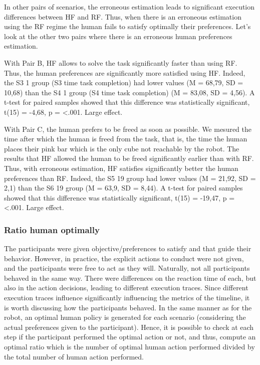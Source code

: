 In other pairs of scenarios, the erroneous estimation leads to significant execution differences between HF and RF. Thus, when there is an erroneous estimation using the RF regime the human fails to satisfy optimally their preferences. Let's look at the other two pairs where there is an erroneous human preferences estimation. 

With Pair B, HF allows to solve the task significantly faster than using RF. Thus, the human preferences are significantly more satisfied using HF.   
Indeed, the S3 1 group (S3 time task completion) had lower values (M = 68,79, SD = 10,68) than the S4 1 group (S4 time task completion) (M = 83,08, SD = 4,56). A t-test for paired samples showed that this difference was statistically significant, t(15) = -4,68, p = <.001. Large effect.

With Pair C, the human prefers to be freed as soon as possible. We mesured the time after which the human is freed from the task, that is, the time the human places their pink bar which is the only cube not reachable by the robot. The results that HF allowed the human to be freed significantly earlier than with RF. Thus, with erroneous estimation, HF satisfies significantly better the human preferences than RF.
Indeed, the S5 19 group had lower values (M = 21,92, SD = 2,1) than the S6 19 group (M = 63,9, SD = 8,44). A t-test for paired samples showed that this difference was statistically significant, t(15) = -19,47, p = <.001. Large effect. 

\subsubsection*{Ratio human optimally}
The participants were given objective/preferences to satisfy and that guide their behavior. However, in practice, the explicit actions to conduct were not given, and the participants were free to act as they will. Naturally, not all participants behaved in the same way. There were differences on the reaction time of each, but also in the action decisions, leading to different execution traces. Since different execution traces influence significantly influencing the metrics of the timeline, it is worth discussing how the participants behaved.
In the same manner as for the robot, an optimal human policy is generated for each scenario (considering the actual preferences given to the participant). Hence, it is possible to check at each step if the participant performed the optimal action or not, and thus, compute an optimal ratio which is the number of optimal human action performed divided by the total number of human action performed.  


